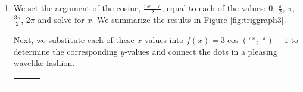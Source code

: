 {
\begin{enumerate}

\item  We set the argument of the cosine, $\frac{\pi x - \pi}{2}$, equal to each of the values:  $0$, $\frac{\pi}{2}$, $\pi$, $\frac{3\pi}{2}$, $2\pi$ and solve for $x$. We summarize the results in Figure \ref{fig:triggraph3}.


Next, we substitute each of these $x$ values into $f(x) = 3 \cos\left(\frac{\pi x - \pi}{2}\right) + 1$ to determine the corresponding $y$-values and connect the dots in a pleasing wavelike fashion. 

\medskip

\noindent\hskip-30pt\begin{minipage}{\textwidth}
\begin{center}
\begin{tabular}{m{} m{}}
\setlength{\extrarowheight}{2pt}
\setlength{\extrarowheight}{2pt}
\[ \begin{array}{|r||r|r|}  


\end{array}\]
\end{tabular}
\end{center}
\end{minipage}
\end{enumerate}}
